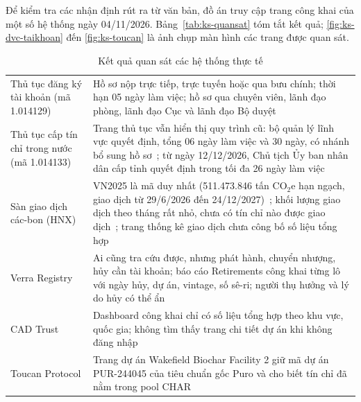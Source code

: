 Để kiểm tra các nhận định rút ra từ văn bản, đồ án truy cập trang công khai của một số hệ thống ngày 04/11/2026. Bảng~\ref{tab:ks-quansat} tóm tắt kết quả; \autoref{fig:ks-dvc-taikhoan} đến \autoref{fig:ks-toucan} là ảnh chụp màn hình các trang được quan sát.

\begin{table}[!htbp]
    \centering
    \caption{Kết quả quan sát các hệ thống thực tế}
    \label{tab:ks-quansat}
    \label{tab:ks-quansat-qt}
    \small
    \begin{tabularx}{\textwidth}{|L{3.0cm}|Y|}
        \hline
         &  \\
        \hline
        Thủ tục đăng ký tài khoản (mã 1.014129) & Hồ sơ nộp trực tiếp, trực tuyến hoặc qua bưu chính; thời hạn 05 ngày làm việc; hồ sơ qua chuyên viên, lãnh đạo phòng, lãnh đạo Cục và lãnh đạo Bộ duyệt~\cite{mae2026tthc1014129,mae2025qd2935} \\
        \hline
        Thủ tục cấp tín chỉ trong nước (mã 1.014133) & Trang thủ tục vẫn hiển thị quy trình cũ: bộ quản lý lĩnh vực quyết định, tổng 06 ngày làm việc và 30 ngày, có nhánh bổ sung hồ sơ~\cite{mae2026tthc1014133}; từ ngày 12/12/2026, Chủ tịch Ủy ban nhân dân cấp tỉnh quyết định trong tối đa 26 ngày làm việc~\cite{vietnam2026nghidinh396} \\
        \hline
        Sàn giao dịch các-bon (HNX) & VN2025 là mã duy nhất (511.473.846 tấn CO$_2$e hạn ngạch, giao dịch từ 29/6/2026 đến 24/12/2027)~\cite{hnx2026vn2025,hnx2026danhmuchanngach}; khối lượng giao dịch theo tháng rất nhỏ, chưa có tín chỉ nào được giao dịch~\cite{hnx2026sanphamcacbon}; trang thống kê giao dịch chưa công bố số liệu tổng hợp~\cite{hnx2026ketquagd} \\
        \hline
        Verra Registry & Ai cũng tra cứu được, nhưng phát hành, chuyển nhượng, hủy cần tài khoản; báo cáo Retirements công khai từng lô với ngày hủy, dự án, vintage, số sê-ri; người thụ hưởng và lý do hủy có thể ẩn~\cite{verraregistry,verra2020registryv2} \\
        \hline
        CAD Trust & Dashboard công khai chỉ có số liệu tổng hợp theo khu vực, quốc gia; không tìm thấy trang chi tiết dự án khi không đăng nhập~\cite{cadtrust2026dashboard} \\
        \hline
        Toucan Protocol & Trang dự án Wakefield Biochar Facility 2 giữ mã dự án PUR-244045 của tiêu chuẩn gốc Puro và cho biết tín chỉ đã nằm trong pool CHAR~\cite{toucan2026wakefield} \\
        \hline
    \end{tabularx}
\end{table}

